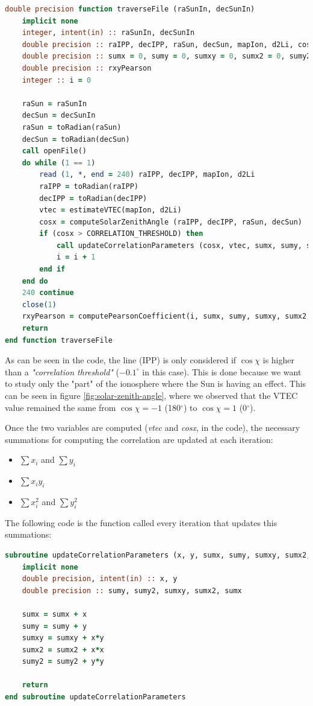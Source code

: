 \begin{minipage}{\linewidth}
\begin{lstlisting}[language=Fortran, caption=Correlation computation]
double precision function traverseFile (raSunIn, decSunIn)
	implicit none
	integer, intent(in) :: raSunIn, decSunIn
	double precision :: raIPP, decIPP, raSun, decSun, mapIon, d2Li, cosX, vtec
	double precision :: sumx = 0, sumy = 0, sumxy = 0, sumx2 = 0, sumy2 = 0
	double precision :: rxyPearson
	integer :: i = 0
	
	raSun = raSunIn
	decSun = decSunIn
	raSun = toRadian(raSun)
	decSun = toRadian(decSun)
	call openFile()
	do while (1 == 1)
		read (1, *, end = 240) raIPP, decIPP, mapIon, d2Li
		raIPP = toRadian(raIPP)
		decIPP = toRadian(decIPP)
		vtec = estimateVTEC(mapIon, d2Li)
		cosx = computeSolarZenithAngle (raIPP, decIPP, raSun, decSun)
		if (cosx > CORRELATION_THRESHOLD) then
			call updateCorrelationParameters (cosx, vtec, sumx, sumy, sumxy, sumx2, sumy2)
			i = i + 1
		end if	
	end do
	240 continue
	close(1)
	rxyPearson = computePearsonCoefficient(i, sumx, sumy, sumxy, sumx2, sumy2)
	return
end function traverseFile
\end{lstlisting}
\end{minipage}

As can be seen in the code, the line (IPP) is only considered if $\cos\chi$ is higher than a \textit{"correlation threshold"} ($-0.1^{\circ}$ in this case). This is done because we want to study only the "part" of the ionosphere where the Sun is having an effect. This can be seen in figure \ref{fig:solar-zenith-angle}, where we observed that the VTEC value remained the same from $\cos\chi = -1$ (180$^{\circ}$) to $\cos\chi = 1$ (0$^{\circ}$).

Once the two variables are computed (\textit{vtec} and \textit{cosx}, in the code), the necessary summations for computing the correlation are updated at each iteration:

\begin{itemize}
	\item $\sum x_{i}$ and $\sum y_{i}$
	\item $\sum x_{i}y_{i}$
	\item $\sum x_{i}^{2}$ and $\sum y_{i}^{2}$
\end{itemize}

The following code is the function called every iteration that updates this summations:

\begin{minipage}{\linewidth}
\begin{lstlisting}[language=Fortran, caption=Updating the summations]
subroutine updateCorrelationParameters (x, y, sumx, sumy, sumxy, sumx2, sumy2)
	implicit none
	double precision, intent(in) :: x, y
	double precision :: sumy, sumy2, sumxy, sumx2, sumx

	sumx = sumx + x
	sumy = sumy + y
	sumxy = sumxy + x*y
	sumx2 = sumx2 + x*x
	sumy2 = sumy2 + y*y

	return
end subroutine updateCorrelationParameters
\end{lstlisting}
\end{minipage}


